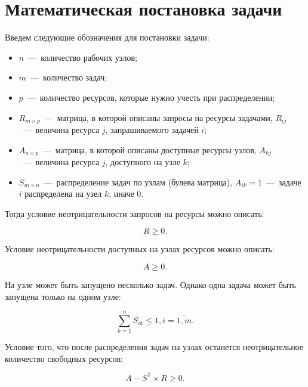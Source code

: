 \chapter{Математическая постановка задачи}

Введем следующие обозначения для постановки задачи:

\begin{itemize}
\item $n$~---~количество рабочих узлов;
\item $m$~---~количество задач;
\item $p$~---~количество ресурсов, которые нужно учесть при распределении;
\item $R_{m \times p}$~---~матрица, в которой описаны запросы на ресурсы задачами, $R_{ij}$~---~величина ресурса $j$, запрашиваемого задачей $i$;
\item $A_{n \times p}$~---~матрица, в которой описаны доступные ресурсы узлов, $A_{kj}$~---~величина ресурса $j$, доступного на узле $k$;
\item $S_{m \times n}$~---~распределение задач по узлам (булева матрица), $A_{ik} = 1$~---~задаче $i$ распределена на узел $k$, иначе $0$.
\end{itemize}

Тогда условие неотрицательности запросов на ресурсы можно описать:

\begin{equation}
	R \ge 0.
\end{equation}

Условие неотрицательности доступных на узлах ресурсов можно описать:

\begin{equation}
	A \ge 0.
\end{equation}

На узле может быть запущено несколько задач. Однако одна задача может быть запущена только на одном узле:

\begin{equation}
	\sum_{k = 1}^{n} S_{ik} \le 1, i = \overline{1, m}.
\end{equation}

Условие того, что после распределения задач на узлах останется неотрицательное количество свободных ресурсов:


\begin{equation}
	A - S^\mathsf{T} \times R \ge 0.
\end{equation}

